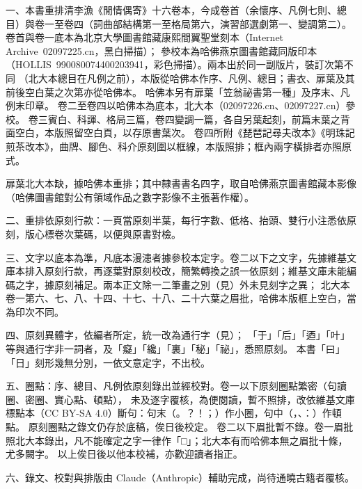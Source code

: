 
一、本書重排清李漁《閒情偶寄》十六卷本，今成卷首（余懷序、凡例七則、總目）與卷一至卷四（詞曲部結構第一至格局第六，演習部選劇第一、變調第二）。
卷首與卷一底本為北京大學圖書館藏康熙間翼聖堂刻本\allowbreak（Internet Archive\allowbreak\ 02097225.cn，黑白掃描）；
參校本為哈佛燕京圖書館藏同版印本\allowbreak（HOLLIS\allowbreak\ 990080074400203941，彩色掃描）。兩本出於同一副版片，裝訂次第不同
（北大本總目在凡例之前），本版從哈佛本作序、凡例、總目；書衣、扉葉及其前後空白葉之次第亦從哈佛本。
哈佛本另有扉葉「笠翁祕書第一種」及序末、凡例末印章。
卷二至卷四以哈佛本為底本，北大本（02097226.cn、02097227.cn）參校。
卷三賓白、科諢、格局三篇，卷四變調一篇，各自另葉起刻，前篇末葉之背面空白，本版照留空白頁，以存原書葉次。
卷四所附《琵琶記尋夫改本》《明珠記煎茶改本》，曲牌、腳色、科介原刻圍以框線，本版照排；框內兩字橫排者亦照原式。

扉葉北大本缺，據哈佛本重排；其中隸書書名四字，取自哈佛燕京圖書館藏本影像（哈佛圖書館對公有領域作品之數字影像不主張著作權）。

二、重排依原刻行款：一頁當原刻半葉，每行字數、低格、抬頭、雙行小注悉依原刻，版心標卷次葉碼，以便與原書對檢。

三、文字以底本為準，凡底本漫漶者據參校本定字。卷二以下之文字，先據維基文庫本排入原刻行款，再逐葉對原刻校改，簡繁轉換之誤一依原刻；維基文庫未能編碼之字，據原刻補足。兩本正文除一二筆畫之別（見）外未見刻字之異；
北大本卷一第六、七、八、十四、十七、十八、二十六葉之眉批，哈佛本版框上空白，當為印次不同。

四、原刻異體字，依編者所定，統一改為通行字（見\varref）；
「于」「后」「迺」「叶」等與通行字非一詞者，及「癡」「纔」「裏」「秘」「祕」，悉照原刻。
本書「曰」「日」刻形幾無分別，一依文意定字，不出校。

五、圈點：序、總目、凡例依原刻錄出並經校對。卷一以下原刻圈點繁密（句讀圈、密圈、實心點、頓點），
未及逐字覆核，為便閱讀，暫不照排，改依維基文庫標點本（CC BY-SA 4.0）斷句：句末（。？！；）作小圈，句中（，、：）作頓點。
原刻圈點之錄文仍存於底稿，俟日後校定。
卷二以下眉批暫不錄。卷一眉批照北大本錄出，凡不能確定之字一律作「□」；北大本有而哈佛本無之眉批十條，尤多闕字。
以上俟日後以他本校補，亦歡迎讀者指正。

六、錄文、校對與排版由 Claude（Anthropic）輔助完成，尚待通曉古籍者覆核。
